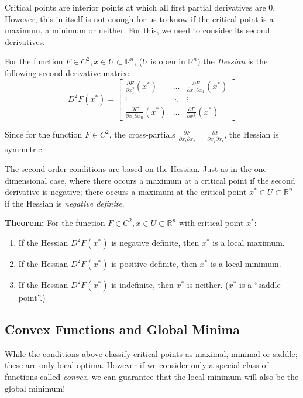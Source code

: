 \documentclass[11pt,]{article}
\providecommand{\tightlist}{%
  \setlength{\itemsep}{0pt}\setlength{\parskip}{0pt}}
\begin{document}
Critical points are interior points at which all first partial
derivatives are 0. However, this in itself is not enough for us to know
if the critical point is a maximum, a minimum or neither. For this, we
need to consider its second derivatives.

For the function \(F\in C^2, x\in U\subset \mathbb{R}^n\), (\(U\) is
open in \(\mathbb{R}^n\)) the \emph{Hessian} is the following second
derivative matrix: \[
D^2F(x^*) = \begin{bmatrix}
\frac{\partial F}{\partial x_1^2}(x^*) & \hdots &\frac{\partial F}{\partial x_n\partial x_1}(x^*)\\
\vdots & \ddots & \vdots\\
\frac{\partial F}{\partial x_1\partial x_n}(x^*) & \hdots & \frac{\partial F}{\partial x_n^2}(x^*)
\end{bmatrix}
\]

Since for the function \(F\in C^2\), the cross-partials
\(\frac{\partial F}{\partial x_i \partial x_j} = \frac{\partial F}{\partial x_j \partial x_i}\),
the Hessian is symmetric.

The second order conditions are based on the Hessian. Just as in the one
dimensional case, where there occurs a maximum at a critical point if
the second derivative is negative; there occurs a maximum at the
critical point \(x^*\in U\subset \mathbb{R}^n\) if the Hessian is
\emph{negative definite}.

\textbf{Theorem:} For the function
\(F\in C^2, x\in U\subset \mathbb{R}^n\) with critical point \(x^*\):

\begin{enumerate}
\def\labelenumi{\arabic{enumi}.}
\tightlist
\item
  If the Hessian \(D^2F(x^*)\) is negative definite, then \(x^*\) is a
  local maximum.
\item
  If the Hessian \(D^2F(x^*)\) is positive definite, then \(x^*\) is a
  local minimum.
\item
  If the Hessian \(D^2F(x^*)\) is indefinite, then \(x^*\) is neither.
  (\(x^*\) is a ``saddle point''.)
\end{enumerate}

\subsection{Convex Functions and Global
Minima}\label{convex-functions-and-global-minima}

While the conditions above classify critical points as maximal, minimal
or saddle; these are only local optima. However if we consider only a
special class of functions called \emph{convex}, we can guarantee that
the local minimum will also be the global minimum!
\end{document}
